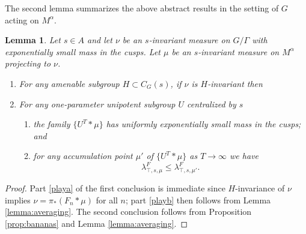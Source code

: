 \documentclass[10pt,reqno]{amsart}
\theoremstyle{Theorem}
\newtheorem{lemma}[theorem]{Lemma}
\theoremstyle{definition}
\theoremstyle{remark}
\newcommand{\note}[1]{\marginpar{{\color{red}\footnotesize \begin{spacing}{1}#1\end{spacing}}}}
\newcommand{\R}{\mathbb {R}}
\newcommand{\Z}{\mathbb {Z}}
\newcommand{\Sl}{\mathrm{SL}}
\def\SL{\Sl}
\def\Folner{F{\o}lner }
\begin{document}
The second lemma summarizes the above abstract results in the setting of $G$ acting on $M^\alpha$.  %


\begin{lemma}
\label{lemma:averagingsuspension}
Let $s\in A$ and let $\nu$ be an $s$-invariant measure on $G/\Gamma$ with exponentially small mass in the cusps.  %
 Let $\mu$ be an $s$-invariant measure on $M^\alpha$ projecting to $\nu$.
\begin{enumerate}
\item \label{pla}For any amenable subgroup $H\subset C_G(s)$, if $\nu$ is $H$-invariant then
\item  %
For any one-parameter unipotent subgroup $U$ centralized by $s$
\begin{enumerate}
\item the family
 $\{U^T \ast \mu\}$ has uniformly exponentially small mass in the cusps;  and \item for any accumulation point   $\mu'$ of $\{U^T \ast \mu\}$  as $T\to \infty$ we have
$$\lambda_{\top, s, \mu} ^F\le \lambda_{\top,s, \mu'}^F.$$
\end{enumerate}
\end{enumerate}
\end{lemma}


\begin{proof}
Part \ref{playa} of the first conclusion is immediate since $H$-invariance of $\nu$ implies $\nu=\pi_*(F_n\ast \mu)$ for all $n$;  %
part \ref{playb} then follows from %
Lemma \ref{lemma:averaging}.
The second conclusion follows from  Proposition \ref{prop:bananas} %
and Lemma \ref{lemma:averaging}.  %
\end{proof}
\end{document}
